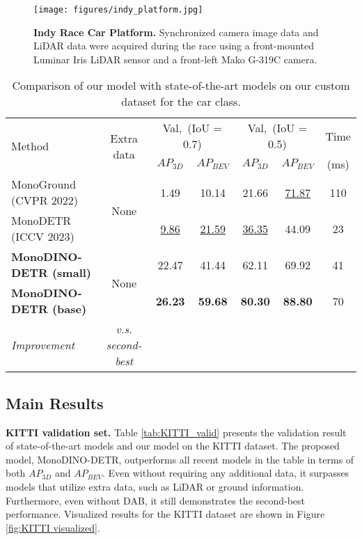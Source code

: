 \begin{figure}[t]
    \centering
    \texttt{[image: figures/indy\_platform.jpg]}
    \caption[Indy Race Car Platform]{\textbf{Indy Race Car Platform.} Synchronized camera image data and LiDAR data were acquired during the race using a front-mounted Luminar Iris LiDAR sensor and a front-left Mako G-319C camera.
    } \label{fig:Indy car platform}
\end{figure}

\begin{table*}[h]
\caption[Comparison of our model with state-of-the-art models on our custom dataset]{Comparison of our model with state-of-the-art models on our custom dataset for the car class.}
\centering
\small
\begin{tabular}{l|c|cc|cc|c}
	\toprule
\multirow{2}{*}{Method} & \multirow{2}{*}{Extra data} & \multicolumn{2}{c|}{Val,\ (IoU = 0.7)} & \multicolumn{2}{c|}{Val,\ (IoU = 0.5)} & Time \\ 
& & $AP_{3D}$ & $AP_{BEV}$  & $AP_{3D}$ & $AP_{BEV}$ & (ms) \\
\midrule
MonoGround (CVPR 2022) \cite{qin2022monoground} & \multirow{2}{*}{None} & 1.49 & 10.14 & 21.66 & \underline{71.87} & 110 \\
MonoDETR (ICCV 2023)\cite{zhang2023monodetr} &  & \underline{9.86} & \underline{21.59} & \underline{36.35} & 44.09 & 23 \\
\midrule
\textbf{MonoDINO-DETR {\small (small)}} & \multirow{2}{*}{None} & 22.47 & 41.44 & 62.11 & 69.92 & 41 \\
\textbf{MonoDINO-DETR {\small (base)}} &  & \textbf{26.23} & \textbf{59.68} & \textbf{80.30} & \textbf{88.80} & 70 \\
\textit{Improvement} & \textit{v.s. second-best} & \color{blue}{+16.37} & \color{blue}{+38.09} & \color{blue}{+43.95} & \color{blue}{+16.93} & \\
\bottomrule
\end{tabular}
\label{tab:Cusom_valid}
\end{table*}

\subsection{Main Results}
\textbf{KITTI validation set.} Table \ref{tab:KITTI_valid} presents the validation result of state-of-the-art models and our model on the KITTI dataset. The proposed model, MonoDINO-DETR, outperforms all recent models in the table in terms of both $AP_{3D}$ and  $AP_{BEV}$. Even without requiring any additional data, it surpasses models that utilize extra data, such as LiDAR or ground information.
Furthermore, even without DAB, it still demonstrates the second-best performance. Visualized results for the KITTI dataset are shown in Figure \ref{fig:KITTI visualized}.

